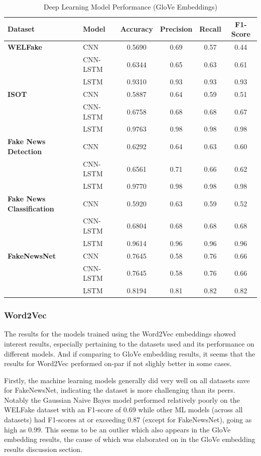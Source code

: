 \documentclass[stu,12pt,floatsintext,donotrepeattitle]{apa7}
\begin{document}
\begin{table}[H]
\centering
\small
\caption{Deep Learning Model Performance (GloVe Embeddings)}
\label{tab:glove_dl}
\begin{tabular}{llcccc}
\toprule
\textbf{Dataset} & \textbf{Model} & \textbf{Accuracy} & \textbf{Precision} & \textbf{Recall} & \textbf{F1-Score} \\
\midrule
\textbf{WELFake} & CNN & 0.5690 & 0.69 & 0.57 & 0.44 \\
 & CNN-LSTM & 0.6344 & 0.65 & 0.63 & 0.61 \\
 & LSTM & 0.9310 & 0.93 & 0.93 & 0.93 \\
\midrule
\textbf{ISOT} & CNN & 0.5887 & 0.64 & 0.59 & 0.51 \\
 & CNN-LSTM & 0.6758 & 0.68 & 0.68 & 0.67 \\
 & LSTM & 0.9763 & 0.98 & 0.98 & 0.98 \\
\midrule
\textbf{Fake News Detection} & CNN & 0.6292 & 0.64 & 0.63 & 0.60 \\
 & CNN-LSTM & 0.6561 & 0.71 & 0.66 & 0.62 \\
 & LSTM & 0.9770 & 0.98 & 0.98 & 0.98 \\
\midrule
\textbf{Fake News Classification} & CNN & 0.5920 & 0.63 & 0.59 & 0.52 \\
 & CNN-LSTM & 0.6804 & 0.68 & 0.68 & 0.68 \\
 & LSTM & 0.9614 & 0.96 & 0.96 & 0.96 \\
\midrule
\textbf{FakeNewsNet} & CNN & 0.7645 & 0.58 & 0.76 & 0.66 \\
 & CNN-LSTM & 0.7645 & 0.58 & 0.76 & 0.66 \\
 & LSTM & 0.8194 & 0.81 & 0.82 & 0.82 \\
\bottomrule
\end{tabular}
\end{table}


\subsubsection{Word2Vec}
The results for the models trained using the Word2Vec embeddings showed interest results, especially pertaining to the datasets used and its performance on different models. And if comparing to GloVe embedding results, it seems that the results for Word2Vec performed on-par if not slighly better in some cases.

Firstly, the machine learning models generally did very well on all datasets save for FakeNewsNet, indicating the dataset is more challenging than its peers. Notably the Gaussian Naive Bayes model performed relatively poorly on the WELFake dataset with an F1-score of 0.69 while other ML models (across all datasets) had F1-scores at or exceeding 0.87 (except for FakeNewsNet), going as high as 0.99. This seems to be an outlier which also appears in the GloVe embedding results, the cause of which was elaborated on in the GloVe embedding results discussion section.
\end{document}
